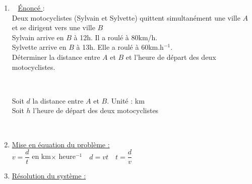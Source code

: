 \begin{enumerate}
\reversemarginpar 
\item \marginpar[\underline{Ex \no 4}]~ \underline{ Énoncé }:\\

Deux motocyclistes (Sylvain et Sylvette) quittent simultanément une ville $A$ et se dirigent vers une ville $B$\\

Sylvain arrive en $B$ à 12h. Il a roulé à 80km/h.\\
Sylvette arrive en $B$ à 13h. Elle a roulé à 60km.h$^{-1}$.\\

Déterminer la distance entre $A$ et $B$ et l'heure de départ des deux motocyclistes.

~\parbox{9cm}{Soit $d$ la distance entre $A$ et $B$. Unité : km \\
              Soit $h$ l'heure de départ des deux motocyclistes}\\

\item \underline{Mise en équation du problème :  }\\

$v = \dfrac{d}{t}$ en km$\times$ heure$^{-1} \quad d=vt \quad t=\dfrac{d}{v}$ \\



\item \underline{Résolution du système : }


\end{enumerate}

